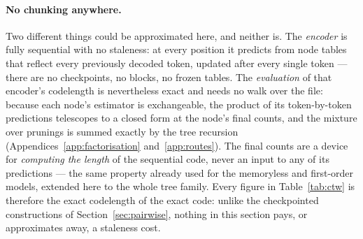 \documentclass[11pt]{article}
\begin{document}
\paragraph{No chunking anywhere.}  Two different things could be
approximated here, and neither is.  The \emph{encoder} is fully
sequential with no staleness: at every position it predicts from
node tables that reflect every previously decoded token, updated
after every single token --- there are no checkpoints, no blocks, no
frozen tables.  The \emph{evaluation} of that encoder's codelength
is nevertheless exact and needs no walk over the file: because each
node's estimator is exchangeable, the product of its token-by-token
predictions telescopes to a closed form at the node's final counts,
and the mixture over prunings is summed exactly by the tree
recursion (Appendices~\ref{app:factorisation}
and~\ref{app:routes}).  The final counts are a device for
\emph{computing the length} of the sequential code, never an input
to any of its predictions --- the same property already used for
the memoryless and first-order models, extended here to the whole
tree family.  Every figure in Table~\ref{tab:ctw} is therefore the
exact codelength of the exact code: unlike the checkpointed
constructions of Section~\ref{sec:pairwise}, nothing in this
section pays, or approximates away, a staleness cost.
\end{document}

